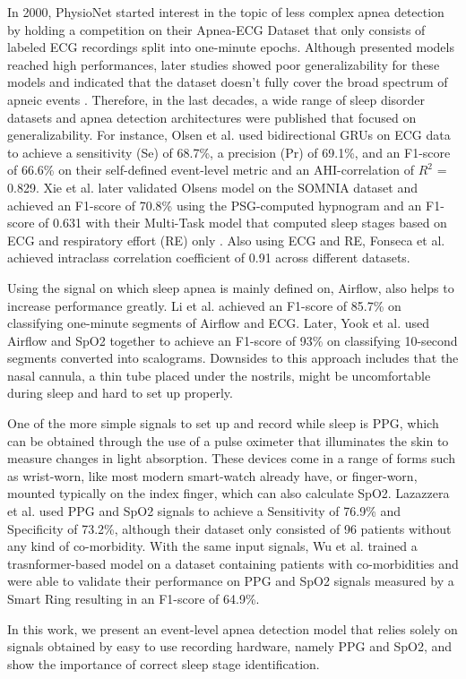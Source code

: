 In 2000, PhysioNet started interest in the topic of less complex apnea
 detection by holding a competition on their Apnea-ECG Dataset that
 only consists of labeled ECG recordings split into one-minute epochs.
 Although presented models reached high performances, later studies showed
 poor generalizability for these models and indicated that the dataset
 doesn't fully cover the broad spectrum of apneic events \cite{papini2018generalizability}. Therefore,
 in the last decades, a wide range of sleep disorder datasets and apnea
 detection architectures were published that focused on generalizability.
For instance, Olsen et al. \cite{olsen2020robust} used bidirectional GRUs
 on ECG data to achieve a sensitivity (Se) of 68.7\%, a precision (Pr)
 of 69.1\%, and an F1-score of 66.6\% on their self-defined event-level
 metric and an AHI-correlation of $R^2$ = 0.829. Xie et al. \cite{xie2023use}
 later validated Olsens model on the SOMNIA dataset and achieved an
 F1-score of 70.8\% using the PSG-computed hypnogram and an F1-score of
 0.631 with their Multi-Task model that computed sleep stages based on
 ECG and respiratory effort (RE) only \cite{xie2024multi}. Also using 
 ECG and RE, Fonseca et al. \cite{fonseca2024estimating} achieved intraclass
 correlation coefficient of 0.91 across different datasets.

Using the signal on which sleep apnea is mainly defined on, Airflow, also
 helps to increase performance greatly. Li et al. \cite{li2023deep} achieved
 an F1-score of 85.7\% on classifying one-minute segments of Airflow and ECG.
 Later, Yook et al. \cite{yook2024deep} used Airflow and SpO2 together to
 achieve an F1-score of 93\% on classifying 10-second segments converted
 into scalograms.
Downsides to this approach includes that the nasal cannula, a thin tube
 placed under the nostrils, might be uncomfortable during sleep and hard
 to set up properly.

One of the more simple signals to set up and record while sleep is PPG, which
 can be obtained through the use of a pulse oximeter that illuminates the skin
 to measure changes in light absorption.
These devices come in a range of forms such as wrist-worn, like most
 modern smart-watch already have, or finger-worn, mounted typically on the
 index finger, which can also calculate SpO2.
Lazazzera et al. \cite {lazazzera2020detection} used PPG and SpO2 signals
 to achieve a Sensitivity of 76.9\% and Specificity of 73.2\%, although their
 dataset only consisted of 96 patients without any kind of co-morbidity.
With the same input signals, Wu et al. \cite{wu2024transformer} trained
 a trasnformer-based model on a dataset containing patients with
 co-morbidities and were able to validate their performance on PPG and SpO2
 signals measured by a Smart Ring resulting in an F1-score of 64.9\%.

In this work, we present an event-level apnea detection model that relies
 solely on signals obtained by easy to use recording hardware, namely
 PPG and SpO2, and show the importance of correct sleep stage identification.
